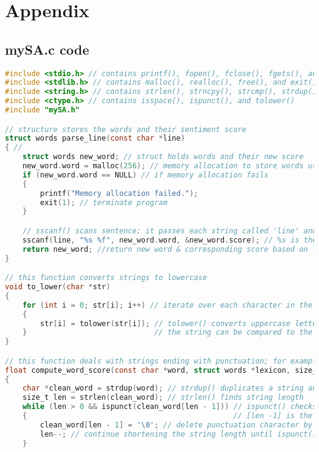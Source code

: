 \documentclass{report}
\begin{document}
\chapter{Appendix}
\section{mySA.c code}
    
\begin{lstlisting}[language=C]
#include <stdio.h> // contains printf(), fopen(), fclose(), fgets(), and sscanf().
#include <stdlib.h> // contains malloc(), realloc(), free(), and exit()
#include <string.h> // contains strlen(), strncpy(), strcmp(), strdup(), and strcspn()
#include <ctype.h> // contains isspace(), ispunct(), and tolower()
#include "mySA.h" 

// structure stores the words and their sentiment score
struct words parse_line(const char *line) 
{ //
    struct words new_word; // struct holds words and their new score
    new_word.word = malloc(256); // memory allocation to store words using malloc()
    if (new_word.word == NULL) // if memory allocation fails
    { 
        printf("Memory allocation failed."); 
        exit(1); // terminate program
    }

    // sscanf() scans sentence; it passes each string called 'line' and returns the score based on lexicon
    sscanf(line, "%s %f", new_word.word, &new_word.score); // %s is the string, %f is the floating-number score
    return new_word; //return new word & corresponding score based on lexicon
}

// this function converts strings to lowercase
void to_lower(char *str) 
{ 
    for (int i = 0; str[i]; i++) // iterate over each character in the string
    { 
        str[i] = tolower(str[i]); // tolower() converts uppercase letters to lowercase, so
    }                             // the string can be compared to the lexicon which is all lowercase
}

// this function deals with strings ending with punctuation; for example "good,", "FUNNY!!!"
float compute_word_score(const char *word, struct words *lexicon, size_t lexicon_size) 
{ 
    char *clean_word = strdup(word); // strdup() duplicates a string and allocates memory for it
    size_t len = strlen(clean_word); // strlen() finds string length
    while (len > 0 && ispunct(clean_word[len - 1])) // ispunct() checks if a character is punctuation
    {                                               // [len -1] is the last character (-1 due to indexing)
        clean_word[len - 1] = '\0'; // delete punctuation character by nullifying it
        len--; // continue shortening the string length until ispunct() can't find punctuation
    }


\end{lstlisting}
\end{document}
